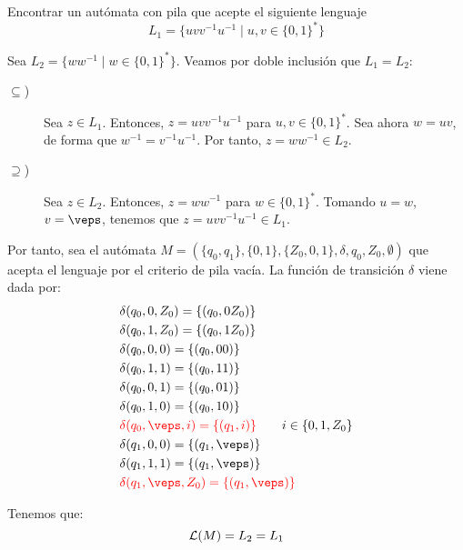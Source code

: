 \begin{ejercicio}\label{ej:1.5.14}
    Encontrar un autómata con pila que acepte el siguiente lenguaje
    \begin{equation*}
        L_1 = \{uvv^{-1}u^{-1}\mid u,v\in {\{0,1\}}^{\ast}\}
    \end{equation*}

    Sea $L_2=\{ww^{-1}\mid w\in {\{0,1\}}^{\ast}\}$. Veamos por doble inclusión que $L_1=L_2$:
    \begin{description}
        \item[$\subseteq$)] Sea $z\in L_1$. Entonces, $z=uvv^{-1}u^{-1}$ para $u,v\in {\{0,1\}}^{\ast}$. Sea ahora $w=uv$, de forma que $w^{-1}=v^{-1}u^{-1}$. Por tanto, $z=ww^{-1}\in L_2$.
        \item[$\supseteq$)] Sea $z\in L_2$. Entonces, $z=ww^{-1}$ para $w\in {\{0,1\}}^{\ast}$. Tomando $u=w$, $v=\veps$, tenemos que $z=uvv^{-1}u^{-1}\in L_1$.
    \end{description}

    Por tanto, sea el autómata $M = (\{q_0,q_1\},\{0,1\},\{Z_0,0,1\},\delta,q_0,Z_0,\emptyset)$ que acepta el lenguaje por el criterio de pila vacía. La función de transición $\delta$ viene dada por:
    \begin{align*}
        &\delta(q_0,0,Z_0) = \{(q_0,0Z_0)\} \\
        &\delta(q_0,1,Z_0) = \{(q_0,1Z_0)\} \\
        &\delta(q_0,0,0) = \{(q_0,00)\} \\
        &\delta(q_0,1,1) = \{(q_0,11)\} \\
        &\delta(q_0,0,1) = \{(q_0,01)\} \\
        &\delta(q_0,1,0) = \{(q_0,10)\} \\
        &\red{\delta(q_0,\veps,i) = \{(q_1,i)\}} \qquad i\in\{0,1,Z_0\} \\
        &\delta(q_1,0,0) = \{(q_1,\veps)\} \\
        &\delta(q_1,1,1) = \{(q_1,\veps)\} \\
        &\red{\delta(q_1,\veps,Z_0) = \{(q_1,\veps)\}}
    \end{align*}

    Tenemos que:
    \begin{equation*}
        \mathcal{L}(M)=L_2=L_1
    \end{equation*}
\end{ejercicio}

